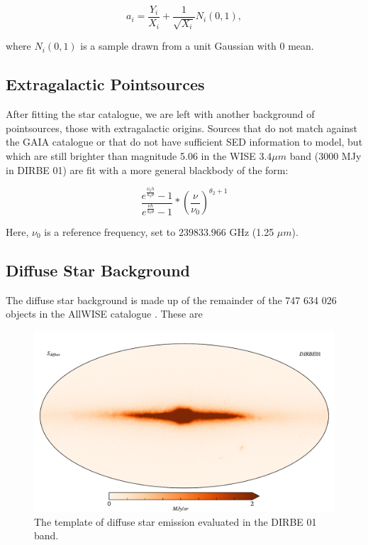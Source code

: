 \documentclass{aa}
\begin{document}
\begin{equation}
a_i = \frac{Y_i}{X_i} + \frac{1}{\sqrt{X_i}} N_i(0,1),
\end{equation}

where $N_i(0,1)$ is a sample drawn from a unit Gaussian with 0 mean.

\subsection{Extragalactic Pointsources}

After fitting the star catalogue, we are left with another background of pointsources, those with extragalactic origins. Sources that do not match against the GAIA catalogue or that do not have sufficient SED information to model, but which are still brighter than magnitude 5.06 in the WISE $3.4 \mu m$ band ($3000$ MJy in DIRBE 01) are fit with a more general blackbody of the form:

\begin{equation}
\frac{e^{\frac{\nu_0 h}{k_b \theta}} - 1}{e^{\frac{\nu h}{k_b \theta}} - 1} * (\frac{\nu}{\nu_0})^{\theta_2 + 1}
\end{equation}

Here, $\nu_0$ is a reference frequency, set to $239833.966$ GHz (1.25 $\mu m$). 

\subsection{Diffuse Star Background}

The diffuse star background is made up of the remainder of the 747 634 026 objects in the AllWISE catalogue \citep{wiseCat}. These are 
 
\begin{figure}
  \centering
  \includegraphics[width=\columnwidth]{figs/diffuseTemplate/diffuse_stars.pdf}
  \caption{The template of diffuse star emission evaluated in the DIRBE 01 band.}
  \label{fig:diffuse}
\end{figure}
\end{document}
